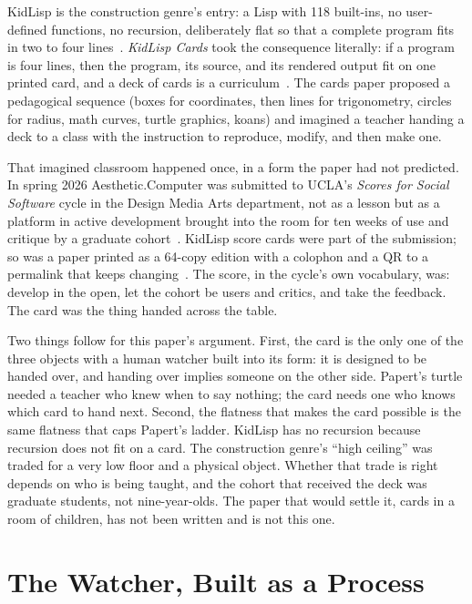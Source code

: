 \documentclass[10pt,letterpaper,twocolumn]{article}
\newcommand{\acdot}{{\color{acpink}.}}
\newcommand{\ac}{Aesthetic{\acdot}Computer}
\newcommand{\term}[1]{``#1''}
\begin{document}
KidLisp is the construction genre's entry: a Lisp with 118 built-ins, no user-defined functions, no recursion, deliberately flat so that a complete program fits in two to four lines~\citep{scudder2026kidlisp}. \emph{KidLisp Cards} took the consequence literally: if a program is four lines, then the program, its source, and its rendered output fit on one printed card, and a deck of cards is a curriculum~\citep{scudder2026kidlispcards}. The cards paper proposed a pedagogical sequence (boxes for coordinates, then lines for trigonometry, circles for radius, math curves, turtle graphics, koans) and imagined a teacher handing a deck to a class with the instruction to reproduce, modify, and then make one.

That imagined classroom happened once, in a form the paper had not predicted. In spring 2026 \ac{} was submitted to UCLA's \emph{Scores for Social Software} cycle in the Design Media Arts department, not as a lesson but as a platform in active development brought into the room for ten weeks of use and critique by a graduate cohort~\citep{sosoft2026proposal}. KidLisp score cards were part of the submission; so was a paper printed as a 64-copy edition with a colophon and a QR to a permalink that keeps changing~\citep{scudder2026keymaps}. The score, in the cycle's own vocabulary, was: develop in the open, let the cohort be users and critics, and take the feedback. The card was the thing handed across the table.

Two things follow for this paper's argument. First, the card is the only one of the three objects with a human watcher built into its form: it is designed to be handed over, and handing over implies someone on the other side. Papert's turtle needed a teacher who knew when to say nothing; the card needs one who knows which card to hand next. Second, the flatness that makes the card possible is the same flatness that caps Papert's ladder. KidLisp has no recursion because recursion does not fit on a card. The construction genre's \term{high ceiling} was traded for a very low floor and a physical object. Whether that trade is right depends on who is being taught, and the cohort that received the deck was graduate students, not nine-year-olds. The paper that would settle it, cards in a room of children, has not been written and is not this one.

\section{The Watcher, Built as a Process}
\label{sec:coach}
\end{document}
